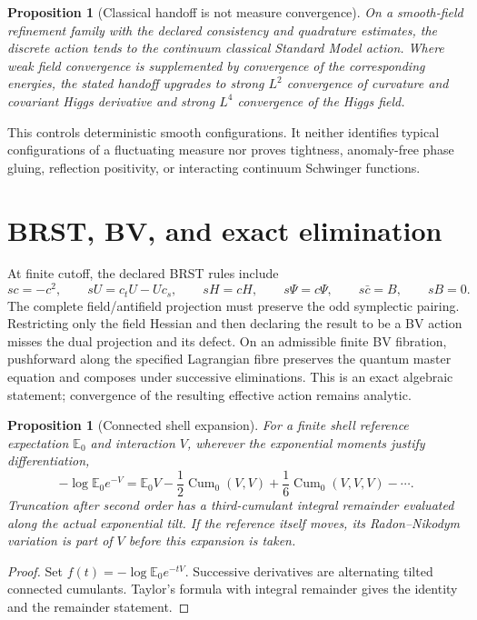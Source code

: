 \documentclass[11pt,a4paper,oneside]{book}
\theoremstyle{plain}
\newtheorem{proposition}[theorem]{Proposition}
\theoremstyle{definition}
\theoremstyle{remark}
\newcommand{\E}{\mathbb E}
\newcommand{\Cum}{\operatorname{Cum}}
\newcommand{\src}[2]{\cite{#1}}
\begin{document}
\begin{proposition}[Classical handoff is not measure convergence]
\label{prop:classical-handoff}
On a smooth-field refinement family with the declared consistency and quadrature estimates, the discrete action tends to the continuum classical Standard Model action. Where weak field convergence is supplemented by convergence of the corresponding energies, the stated handoff upgrades to strong $L^2$ convergence of curvature and covariant Higgs derivative and strong $L^4$ convergence of the Higgs field.
\end{proposition}
\src{GT}{thm:SM-active-SM-II-continuum}
This controls deterministic smooth configurations. It neither identifies typical configurations of a fluctuating measure nor proves tightness, anomaly-free phase gluing, reflection positivity, or interacting continuum Schwinger functions.

\section{BRST, BV, and exact elimination}
At finite cutoff, the declared BRST rules include
\begin{equation}
 s c=-c^2,\qquad sU=c_tU-Uc_s,\qquad sH=cH,\qquad
 s\Psi=c\Psi,\qquad s\bar c=B,\qquad sB=0.
 \label{eq:brst}
\end{equation}
The complete field/antifield projection must preserve the odd symplectic pairing. Restricting only the field Hessian and then declaring the result to be a BV action misses the dual projection and its defect. On an admissible finite BV fibration, pushforward along the specified Lagrangian fibre preserves the quantum master equation and composes under successive eliminations. This is an exact algebraic statement; convergence of the resulting effective action remains analytic. \cite{R1,R2}

\begin{proposition}[Connected shell expansion]
\label{prop:cumulant-shell}
For a finite shell reference expectation $\E_0$ and interaction $V$, wherever the exponential moments justify differentiation,
\begin{equation}
 -\log\E_0e^{-V}
 =\E_0V-\frac12\Cum_0(V,V)+\frac16\Cum_0(V,V,V)-\cdots.
 \label{eq:shell-cumulants}
\end{equation}
Truncation after second order has a third-cumulant integral remainder evaluated along the actual exponential tilt. If the reference itself moves, its Radon--Nikodym variation is part of $V$ before this expansion is taken.
\end{proposition}
\begin{proof}
Set $f(t)=-\log\E_0e^{-tV}$. Successive derivatives are alternating tilted connected cumulants. Taylor's formula with integral remainder gives the identity and the remainder statement.
\end{proof}
\cite{R1,R4,R16}
\end{document}
